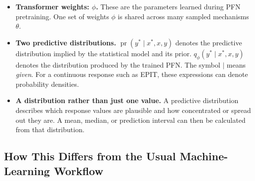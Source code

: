 \documentclass[11pt]{article}
\newcommand{\pr}{\operatorname{pr}}
\newenvironment{notes}
  {\begin{itemize}\setlength{\itemsep}{0.45em}\setlength{\parsep}{0pt}}
  {\end{itemize}}
\begin{document}
\begin{notes}
    \item \textbf{Transformer weights: \(\phi\).} These are the
    parameters learned during PFN pretraining. One set of weights
    \(\phi\) is shared across many sampled mechanisms \(\theta\).

    \item \textbf{Two predictive distributions.}
    \(\pr(y^\ast\mid x^\ast,x,y)\) denotes the predictive distribution
    implied by the statistical model and its prior.
    \(q_\phi(y^\ast\mid x^\ast,x,y)\) denotes the distribution
    produced by the trained PFN. The symbol \(\mid\) means
    \emph{given}. For a continuous response such as EPIT, these
    expressions can denote probability densities.

    \item \textbf{A distribution rather than just one value.}
    A predictive distribution describes which response values are
    plausible and how concentrated or spread out they are.
    A mean, median, or prediction interval can then be calculated
    from that distribution.
\end{notes}

\subsection{How This Differs from the Usual Machine-Learning Workflow}
\label{sec:traditional-ml-versus-pfn}
\end{document}

